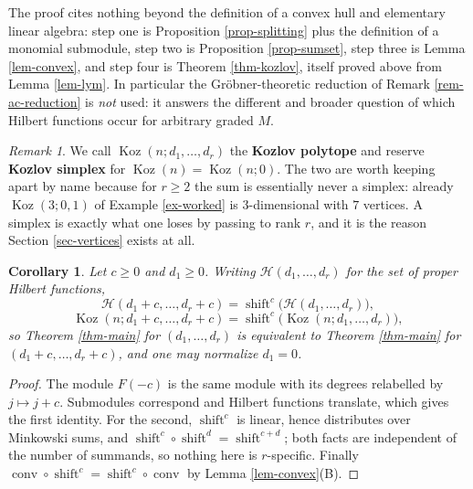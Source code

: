 \documentclass[11pt, a4paper, abstract=yes]{scrartcl}
\theoremstyle{definition}
\theoremstyle{remark}
\newtheorem{remark}[definition]{Remark}
\theoremstyle{plain}
\newtheorem{corollary}[definition]{Corollary}
\newcommand{\Koz}{\operatorname{Koz}}
\newcommand{\shift}{\operatorname{shift}}
\newcommand{\conv}{\operatorname{conv}}
\begin{document}
The proof cites nothing beyond the definition of a convex hull and elementary linear algebra: step
one is Proposition \ref{prop-splitting} plus the definition of a monomial submodule, step two is
Proposition \ref{prop-sumset}, step three is Lemma \ref{lem-convex}, and step four is Theorem \ref{thm-kozlov},
itself proved above from Lemma \ref{lem-lym}. In particular the Gröbner-theoretic reduction of
Remark \ref{rem-ac-reduction} is \emph{not} used: it answers the different and broader question of which
Hilbert functions occur for arbitrary graded \(M\).

\begin{remark}
We call \(\Koz(n;d_1,\dots,d_r)\) the \textbf{Kozlov polytope} and reserve \textbf{Kozlov simplex} for
\(\Koz(n)=\Koz(n;0)\). The two are worth keeping apart by name because for \(r\ge2\) the sum is
essentially never a simplex: already \(\Koz(3;0,1)\) of Example \ref{ex-worked} is \(3\)-dimensional with
\(7\) vertices. A simplex is exactly what one loses by passing to rank \(r\), and it is the reason
Section \ref{sec-vertices} exists at all.
\label{rem-name}
\end{remark}

\begin{corollary}
Let \(c\ge0\) and \(d_1\ge0\). Writing \(\mathcal H(d_1,\dots,d_r)\) for the set of proper Hilbert
functions,
\begin{equation}\label{eq:normalization}
  \mathcal H(d_1+c,\dots,d_r+c)=\shift^c\bigl(\mathcal H(d_1,\dots,d_r)\bigr),
\end{equation}
\begin{equation}\label{eq:normalization-2}
  \Koz(n;d_1+c,\dots,d_r+c)=\shift^{c}\bigl(\Koz(n;d_1,\dots,d_r)\bigr),
\end{equation}
so Theorem \ref{thm-main} for \((d_1,\dots,d_r)\) is equivalent to Theorem \ref{thm-main} for
\((d_1+c,\dots,d_r+c)\), and one may normalize \(d_1=0\).
\label{cor-normalization}
\end{corollary}

\begin{proof}
The module \(F(-c)\) is the same module with its degrees relabelled by \(j\mapsto j+c\).
Submodules correspond and Hilbert functions translate, which gives the first identity. For the second, \(\shift^c\) is linear,
hence distributes over Minkowski sums, and \(\shift^c\circ\shift^{d}=\shift^{c+d}\); both facts are
independent of the number of summands, so nothing here is \(r\)-specific. Finally
\(\conv\circ\shift^c=\shift^c\circ\conv\) by Lemma \ref{lem-convex}(B).
\end{proof}
\end{document}

